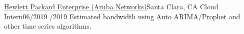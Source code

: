 \resumeSubheading
{\href{https://www.arubanetworks.com/company/about-us/}{Hewlett Packard Enterprise (Aruba Networks)}}{Santa Clara, CA}
{Cloud Intern}{06/2019 /2019}
\resumeItemListStart
{}
{Estimated bandwidth using \href{https://en.wikipedia.org/wiki/Autoregressive_integrated_moving_average}{Auto ARIMA}/\href{https://facebook.github.io/prophet/}{Prophet} and other time series algorithms.}
\resumeItemListEnd

